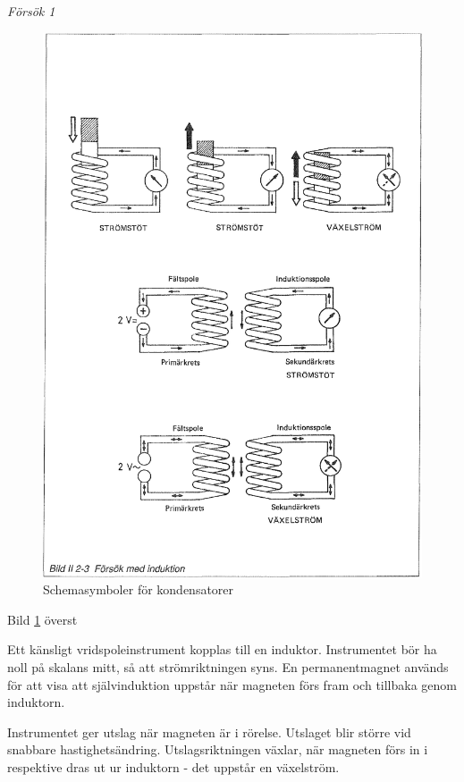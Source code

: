 \emph{Försök 1}

\begin{figure}
\includegraphics[width=\textwidth]{images/bild_2_2-03}
\caption{Schemasymboler för kondensatorer}
\label{fig:BildII2-3}
\end{figure}

Bild \ref{fig:BildII2-3} överst

Ett känsligt vridspoleinstrument kopplas till en induktor. Instrumentet bör ha
noll på skalans mitt, så att strömriktningen syns. En permanentmagnet används
för att visa att självinduktion uppstår när magneten förs fram och tillbaka
genom induktorn.

Instrumentet ger utslag när magneten är i rörelse. Utslaget blir större vid
snabbare hastighetsändring. Utslagsriktningen växlar, när magneten förs in i
respektive dras ut ur induktorn - det uppstår en växelström.

